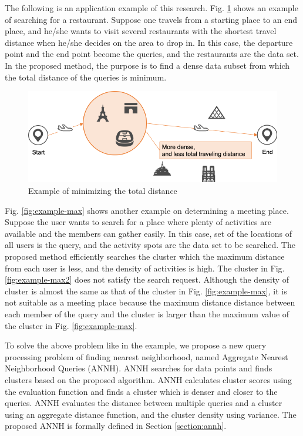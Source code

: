 \documentclass[a4paper,11pt]{report}
\theoremstyle{mytheoremstyle}
\begin{document}
The following is an application example of this research. Fig. \ref{fig:example-sum} shows an example of searching for a restaurant. Suppose one travels from a starting place to an end place, and he/she wants to visit several restaurants with the shortest travel distance when he/she decides on the area to drop in. In this case, the departure point and the end point become the queries, and the restaurants are the data set. In the proposed method, the purpose is to find a dense data subset from which the total distance of the queries is minimum.

\begin{figure}
\includegraphics[width=\textwidth]{images/example-sum.png}
\caption{Example of minimizing the total distance} \label{fig:example-sum}
\end{figure}

Fig. \ref{fig:example-max} shows another example on determining a meeting place. Suppose the user wants to search for a place where plenty of activities are available and the members can gather easily. In this case, set of the locations of all users is the query, and the activity spots are the data set to be searched. The proposed method efficiently searches the cluster which the maximum distance from each user is less, and the density of activities is high. The cluster in Fig. \ref{fig:example-max2} does not satisfy the search request.
Although the density of cluster is almost the same as that of the cluster in Fig. \ref{fig:example-max}, it is not suitable as a meeting place because the maximum distance distance between each member of the query and the cluster is larger than the maximum value of the cluster in Fig. \ref{fig:example-max}.

To solve the above problem like in the example, we propose a new query processing problem of finding nearest neighborhood, named Aggregate Nearest Neighborhood Queries (ANNH).
ANNH searches for data points and finds clusters based on the proposed algorithm. ANNH calculates cluster scores using the evaluation function and finds a cluster which is denser and closer to the queries. ANNH evaluates the distance between multiple queries and a cluster using an aggregate distance function, and the cluster density using variance. The proposed ANNH is formally defined in Section \ref{section:annh}.
\end{document}

